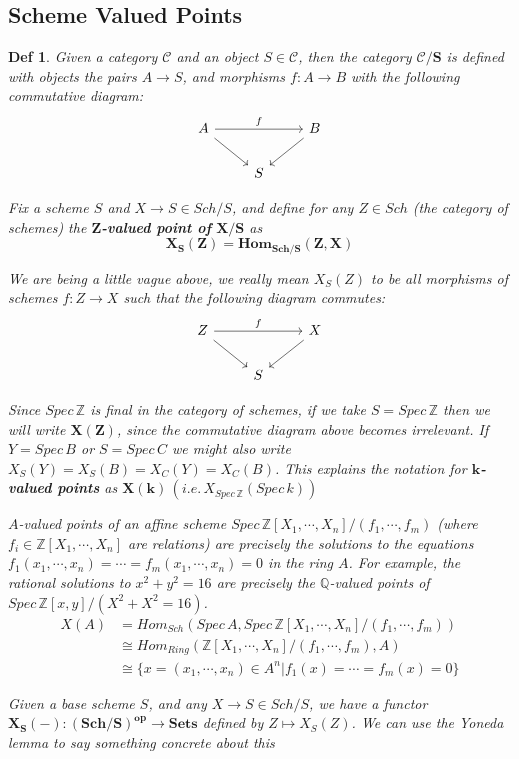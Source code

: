 \documentclass{article}
\newtheorem{definition}[theorem]{Def}
\begin{document}
\subsection{Scheme Valued Points}
\begin{definition}
Given a category $\mathcal C$ and an object $S \in\mathcal C$, then the category
$\bm{\mathcal C/S}$ is defined with objects the pairs $A \rightarrow S$, and morphisms $f : A \rightarrow B$ with the following commutative
diagram:
\[\begin{tikzcd}
	A && B \\
	& S
	\arrow[from=1-1, to=2-2]
	\arrow["f", from=1-1, to=1-3]
	\arrow[from=1-3, to=2-2]
\end{tikzcd}\]

Fix a scheme $S$ and $X\to S\in Sch/S$, and define for any $Z \in Sch$ (the category of schemes) the $\bm Z$\textbf{-valued point of} $\bm{X/S}$ as
$$\bm{X_S(Z) = Hom_{Sch/S}(Z, X)}$$

We are being a little vague above, we really mean $X_S(Z)$ to be all morphisms of schemes $f : Z \to X$
such that the following diagram commutes:
\[\begin{tikzcd}
	Z && X \\
	& S
	\arrow[from=1-1, to=2-2]
	\arrow["f", from=1-1, to=1-3]
	\arrow[from=1-3, to=2-2]
\end{tikzcd}\]

Since $Spec\,\mathbb Z$ is final in the category of schemes, if we take $S = Spec\,\mathbb Z$ then we will write $\bm{X(Z)}$, since
the commutative diagram above becomes irrelevant. If $Y = Spec\, B$ or $S = Spec\, C$ we might also write
$X_S(Y)=X_S(B)=X_C(Y)=X_C(B)$.
This explains the notation for $\bm k$\textbf{-valued points} as $\bm{X(k)}\,(i.e.\,X_{Spec\,\mathbb Z}(Spec\, k))$

$A$-valued
points of an affine scheme $Spec\,\mathbb Z[X_1,\cdots, X_n]/(f_1,\cdots, f_m)$ (where $f_i \in\mathbb Z[X_1,\cdots, X_n]$ are
relations) are precisely the solutions to the equations
$f_1(x_1,\cdots, x_n) =\cdots= f_m(x_1,\cdots, x_n) = 0$
in the ring $A$. For example, the rational solutions to $x^2 + y^2 = 16$ are precisely the
$\mathbb Q$-valued points of $Spec\,\mathbb Z[x, y]/(X^2 + X^2 = 16)$.
\begin{align*}
\label{sup}
X(A)&=Hom_{Sch}(Spec\, A,Spec\,\mathbb Z[X_1,\cdots, X_n]/(f_1,\cdots, f_m))\\
&\cong Hom_{Ring}(\mathbb Z[X_1,\cdots, X_n]/(f_1,\cdots, f_m),A)\\
&\cong\{x=(x_1,\cdots, x_n)\in A^n|f_1(x) =\cdots= f_m(x) = 0\}
 \end{align*}
 
Given a base scheme $S$, and any
$X\to S\in Sch/S$, we have a functor $\bm{X_S(−) : (Sch /S)
^{op}\to Sets}$ defined by $Z \mapsto X_S(Z)$. We can use the
Yoneda lemma to say something concrete about this
\end{definition}
\end{document}
